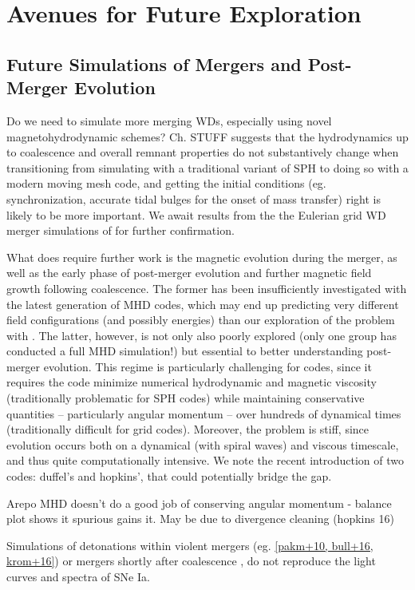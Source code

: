 \section{Avenues for Future Exploration}


\subsection{Future Simulations of Mergers and Post-Merger Evolution}

Do we need to simulate more merging WDs, especially using novel magnetohydrodynamic schemes?  Ch. STUFF suggests that the hydrodynamics up to coalescence and overall remnant properties do not substantively change when transitioning from simulating with a traditional variant of SPH to doing so with a modern moving mesh code, and getting the initial conditions (eg. synchronization, accurate tidal bulges for the onset of mass transfer) right is likely to be more important.  We await results from the the Eulerian grid WD merger simulations of \citep{katz+16} for further confirmation.

What does require further work is the magnetic evolution during the merger, as well as the early phase of post-merger evolution and further magnetic field growth following coalescence.  The former has been insufficiently investigated with the latest generation of MHD codes, which may end up predicting very different field configurations (and possibly energies) than our exploration of the problem with \arepo.  The latter, however, is not only also poorly explored (only one group has conducted a full MHD simulation!) but essential to better understanding post-merger evolution.  This regime is particularly challenging for codes, since it requires the code minimize numerical hydrodynamic and magnetic viscosity (traditionally problematic for SPH codes) while maintaining conservative quantities -- particularly angular momentum -- over hundreds of dynamical times (traditionally difficult for grid codes).  Moreover, the problem is stiff, since evolution occurs both on a dynamical (with spiral waves) and viscous timescale, and thus quite computationally intensive.  We note the recent introduction of two codes: duffel's and hopkins', that could potentially bridge the gap.

Arepo MHD doesn't do a good job of conserving angular momentum - balance plot shows it spurious gains it.  May be due to divergence cleaning (hopkins 16)


Simulations of detonations within violent mergers (eg. \ref{pakm+10, bull+16, krom+16}) or mergers shortly after coalescence \citep{rask+14,vros+15}, do not reproduce the light curves and spectra of SNe Ia.  

